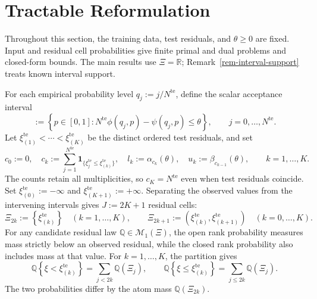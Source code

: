 \documentclass[review,11pt,3p,authoryear,nopreprintline]{elsarticle}
\begin{document}
\section{Tractable Reformulation}
\label{sec-reformulation}

Throughout this section, the training data, test residuals, and $\theta\ge0$ are fixed. Input and residual cell probabilities give finite primal and dual problems and closed-form bounds. The main results use $\Xi=\mathbb R$; Remark~\ref{rem-interval-support} treats known interval support.

For each empirical probability level $q_j:=j/N^{\mathrm{te}}$, define the scalar acceptance interval
\begin{equation}
  [\alpha_j(\theta),\beta_j(\theta)]
  :=\left\{p\in[0,1]:
  N^{\mathrm{te}}\phi(q_j,p)-\psi(q_j,p)\le\theta\right\},
  \qquad j=0,\ldots,N^{\mathrm{te}}.
  \label{eq-dw-rank-acceptance}
\end{equation}
Let $\xi_{(1)}^{\mathrm{te}}<\cdots<\xi_{(K)}^{\mathrm{te}}$ be the distinct ordered test residuals, and set
\begin{equation}
  c_0:=0,\quad
  c_k:=\sum_{j=1}^{N^{\mathrm{te}}}\mathbf1_{\{\xi_j^{\mathrm{te}}\le\xi_{(k)}^{\mathrm{te}}\}},\quad
  l_k:=\alpha_{c_k}(\theta),\quad
  u_k:=\beta_{c_{k-1}}(\theta),\qquad k=1,\ldots,K.
  \label{eq-dw-counts-and-levels}
\end{equation}
The counts retain all multiplicities, so $c_K=N^{\mathrm{te}}$ even when test residuals coincide. Set $\xi_{(0)}^{\mathrm{te}}:=-\infty$ and $\xi_{(K+1)}^{\mathrm{te}}:=+\infty$. Separating the observed values from the intervening intervals gives $J:=2K+1$ residual cells:
\begin{equation}
  \Xi_{2k}:=\left\{\xi_{(k)}^{\mathrm{te}}\right\}
    \quad\left(k=1,\ldots,K\right),
  \qquad
  \Xi_{2k+1}:=\left(\xi_{(k)}^{\mathrm{te}},\xi_{(k+1)}^{\mathrm{te}}\right)
    \quad\left(k=0,\ldots,K\right).
  \label{eq-residual-cells}
\end{equation}
For any candidate residual law $\mathbb Q\in\mathcal M_1(\Xi)$, the open rank probability measures mass strictly below an observed residual, while the closed rank probability also includes mass at that value. For $k=1,\ldots,K$, the partition gives
\[
  \mathbb Q\left\{\xi<\xi_{(k)}^{\mathrm{te}}\right\}
    =\sum_{j<2k}\mathbb Q(\Xi_j),
  \qquad
  \mathbb Q\left\{\xi\le\xi_{(k)}^{\mathrm{te}}\right\}
    =\sum_{j\le2k}\mathbb Q(\Xi_j).
\]
The two probabilities differ by the atom mass $\mathbb Q(\Xi_{2k})$.
\end{document}
